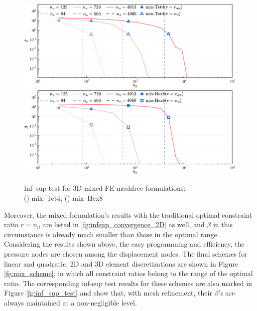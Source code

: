 \begin{figure}[H]
\centering
\begin{subcaptiongroup}
\includegraphics[width=\textwidth]{png/Tet4.png}\label{infsup_convergence_3D_a}
\includegraphics[width=\textwidth]{png/Hex8.png}\label{infsup_convergence_3D_b}
\end{subcaptiongroup}
\captionsetup{aboveskip=0pt}
\caption{\centering Inf--sup test for 3D mixed FE-meshfree formulations: \\ () mix--Tet4; () mix--Hex8}
\label{fg:infsup_convergence_3D}
\end{figure}
Moreover, the mixed formulation's results with the traditional optimal constraint ratio $r=n_d$ are listed in \ref{fg:infsup_convergence_2D} as well, and $\beta$ in this circumstance is already much smaller than those in the optimal range. Considering the results shown above, the easy programming and efficiency, the pressure nodes are chosen among the displacement nodes. The final schemes for linear and quadratic, 2D and 3D element discretizations are shown in Figure \ref{fg:mix_scheme}, in which all constraint ratios belong to the range of the optimal ratio. The corresponding inf-sup test results for these schemes are also marked in Figure \ref{fg:inf_sup_test} and show that, with mesh refinement, their $\beta$'s are always maintained at a non-negligible level.

